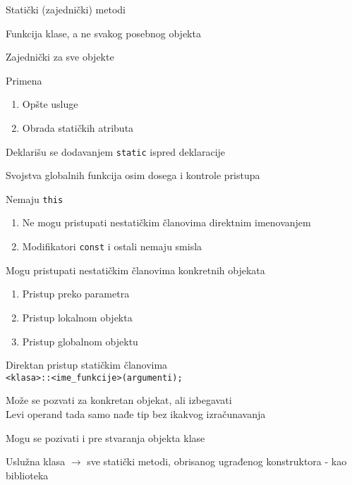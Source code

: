 \documentclass{article}
\newenvironment{xitemize}{%
    
    \itemize
    \larger
}{%
    \enditemize
}
\let\olditemize\itemize
\let\endolditemize\enditemize
\renewenvironment{itemize}{%
    \smaller
    \olditemize
}{%
    \endolditemize
}
\providecommand{\inlinecode}[1]{\texttt{#1}}
\begin{document}
\begin{xitemize}
\item Statički (zajednički) metodi
\begin{itemize}
    \item Funkcija klase, a ne svakog posebnog objekta
    \item Zajednički za sve objekte
    \item Primena
    \begin{enumerate}
        \item Opšte usluge
        \item Obrada statičkih atributa
    \end{enumerate}
    \item Deklarišu se dodavanjem \inlinecode{static} ispred deklaracije
    \item Svojstva globalnih funkcija osim dosega i kontrole pristupa
    \item Nemaju \inlinecode{this}
    \begin{enumerate}
        \item Ne mogu pristupati nestatičkim članovima direktnim imenovanjem
        \item Modifikatori \inlinecode{const} i ostali nemaju smisla
    \end{enumerate}
    \item Mogu pristupati nestatičkim članovima konkretnih objekata
    \begin{enumerate}
        \item Pristup preko parametra
        \item Pristup lokalnom objekta
        \item Pristup globalnom objektu
    \end{enumerate}
    \item Direktan pristup statičkim članovima\\
    \inlinecode{<klasa>::<ime\_funkcije>(argumenti);}
    \item Može se pozvati za konkretan objekat, ali izbegavati\\
    Levi operand tada samo nađe tip bez ikakvog izračunavanja
    \item Mogu se pozivati i pre stvaranja objekta klase
    \item Uslužna klasa $\rightarrow$ sve statički metodi, obrisanog ugrađenog konstruktora - kao biblioteka
\begin{center}
    \begin{adjustwidth}{-4cm}{-2.5cm}


\end{adjustwidth}
\end{center}
\end{itemize}
\end{xitemize}
\end{document}
